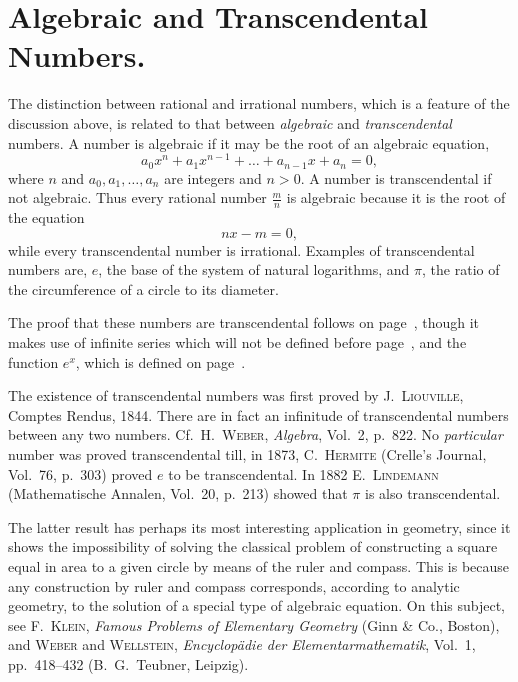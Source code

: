 \documentclass[a4paper,12pt]{book}[2004/02/16]
\providecommand{\hypertarget}[2]{#2}
\theoremstyle{ilemma}
\theoremstyle{itheorem}
\theoremstyle{iother}
\theoremstyle{icorollary}
\theoremstyle{numcorollary}
\theoremstyle{idefinition}
\begin{document}
\section{Algebraic and Transcendental Numbers.}\hypertarget{chIsec7}{}%
The distinction between rational and irrational numbers, which is a
feature of the discussion above, is related to that between
\textit{algebraic} and \textit{transcendental} numbers. A number is
algebraic if it may be the root of an algebraic equation,
\[
  a_0x^n + a_1x^{n-1} + \ldots + a_{n-1}x + a_n = 0,
\]
where $n$ and $a_0,a_1,\ldots,a_n$ are integers and $n>0$. A number is
transcendental if not algebraic. Thus every rational number $\frac mn$
is algebraic because it is the root of the equation
\[
  nx-m=0,
\]
while every transcendental number is irrational. Examples of
transcendental numbers are, $e$, the base of the system of natural
logarithms, and $\pi$, the ratio of the circumference of a circle to
its diameter.

The proof that these numbers are transcendental follows on
page~\pageref{s8p19}, though it makes use of infinite series which
will
not be defined before page~\pageref{dp71}, and the function $e^x$,
which is defined on page~\pageref{dp57}.

The existence of transcendental numbers was first proved by
\textsc{J.~Liouville}, Comptes Rendus, 1844. There are in fact an
infinitude of transcendental numbers between any two numbers.  Cf.\
\textsc{H.~Weber}, \textit{Algebra}, Vol.~2, p.~822. No
\textit{particular} number was proved transcendental till, in 1873,
\textsc{C.~Hermite} (Crelle's Journal, Vol.~76, p.~303) proved $e$ to
be transcendental.  In 1882 \textsc{E.~Lindemann} (Mathematische
Annalen, Vol.~20, p.~213) showed that $\pi$ is also transcendental.

The latter result has perhaps its most interesting application in
geometry, since it shows the impossibility of solving the classical
problem of constructing a square equal in area to a given circle by
means of the ruler and compass. This is because any construction by
ruler and compass corresponds, according to analytic geometry, to the
solution of a special type of algebraic equation. On this subject, see
\textsc{F.~Klein}, \textit{Famous Problems of Elementary Geometry}
(Ginn \& Co., Boston), and \textsc{Weber} and \textsc{Wellstein},
\textit{Encyclop\"adie der Elementarmathematik}, Vol.~1, pp.~418--432
(B.~G.~Teubner, Leipzig).
\end{document}
